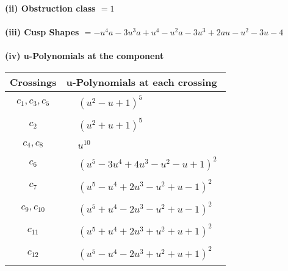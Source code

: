 \documentclass[1p]{elsarticle_modified}
\theoremstyle{definition}
\begin{document}
\flushleft \textbf{(ii) Obstruction class $= 1$}\\~\\
\flushleft \textbf{(iii) Cusp Shapes $= - u^4 a-3 u^3 a+u^4- u^2 a-3 u^3+2 a u- u^2-3 u-4$}\\~\\
\newpage\renewcommand{\arraystretch}{1}
\flushleft \textbf{(iv) u-Polynomials at the component}\newline \\
\begin{tabular}{m{50pt}|m{274pt}}
Crossings & \hspace{64pt}u-Polynomials at each crossing \\
\hline $$\begin{aligned}c_{1},c_{3},c_{5}\end{aligned}$$&$\begin{aligned}
&(u^2- u+1)^5
\end{aligned}$\\
\hline $$\begin{aligned}c_{2}\end{aligned}$$&$\begin{aligned}
&(u^2+u+1)^5
\end{aligned}$\\
\hline $$\begin{aligned}c_{4},c_{8}\end{aligned}$$&$\begin{aligned}
&u^{10}
\end{aligned}$\\
\hline $$\begin{aligned}c_{6}\end{aligned}$$&$\begin{aligned}
&(u^5-3 u^4+4 u^3- u^2- u+1)^2
\end{aligned}$\\
\hline $$\begin{aligned}c_{7}\end{aligned}$$&$\begin{aligned}
&(u^5- u^4+2 u^3- u^2+u-1)^2
\end{aligned}$\\
\hline $$\begin{aligned}c_{9},c_{10}\end{aligned}$$&$\begin{aligned}
&(u^5+u^4-2 u^3- u^2+u-1)^2
\end{aligned}$\\
\hline $$\begin{aligned}c_{11}\end{aligned}$$&$\begin{aligned}
&(u^5+u^4+2 u^3+u^2+u+1)^2
\end{aligned}$\\
\hline $$\begin{aligned}c_{12}\end{aligned}$$&$\begin{aligned}
&(u^5- u^4-2 u^3+u^2+u+1)^2
\end{aligned}$\\
\hline
\end{tabular}\\~\\
\end{document}
